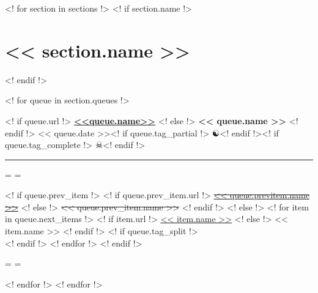 \documentclass[a4paper]{article}
\newenvironment{fontspace}[2]
{\par
  \origiwspc=\fontdimen2\font
  \origiwstr=\fontdimen3\font
  \fontdimen2\font=#1\origiwspc
  \fontdimen3\font=#2\origiwstr
}
{\par
   \fontdimen2\font=\origiwspc
   \fontdimen3\font=\origiwstr
}
\newcommand*{\partialMark}{☯}
\newcommand*{\completeMark}{☠}
\newcommand*{\previous}[1]{\st{#1}}
\begin{document}
<! for section in sections !>
<! if section.name !>
\section*{<< section.name >>}
<! endif !>

<! for queue in section.queues !>
\begin{minipage}{1.0\textwidth}
<! if queue.url !>
\href{<< queue.url >>}{\bfseries <<queue.name>>}\hfill
<! else !>
\textbf{<< queue.name >>}\hfill
<! endif !>
<< queue.date >><! if queue.tag_partial !> \partialMark<! endif !><! if queue.tag_complete !> \completeMark<! endif !>\\
\vspace{-1em}
\hrule
\vspace{0.2em}
\begin{fontspace}{1.5}{2}
<! if queue.prev_item !>
<! if queue.prev_item.url !>
\href{<< queue.prev_item.url >>}{\previous{<< queue.previtem.name >>}}
<! else !>
\previous{<< queue.prev_item.name >>}
<! endif !>
<! else !>
<! for item in queue.next_items !>
<! if item.url !>
\href{<< item.url >>}{<< item.name >>}
<! else !>
<< item.name >>
<! endif !>
<! if queue.tag_split !>\\<! endif !>
<! endfor !>
<! endif !>
\end{fontspace}
\end{minipage}
\vspace{2em}

<! endfor !>
<! endfor !>
\end{document}

